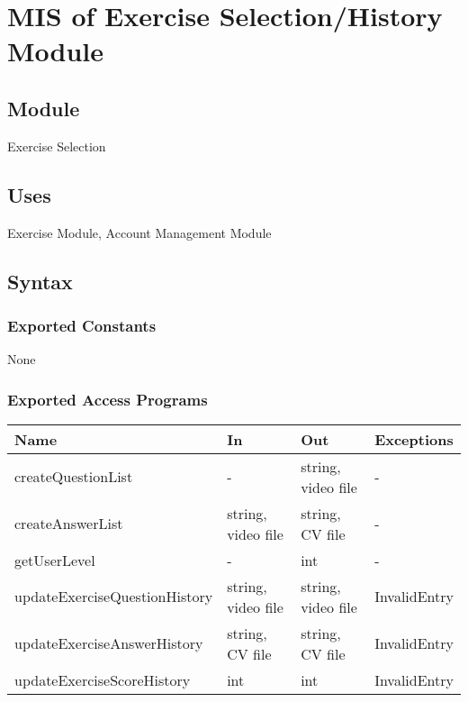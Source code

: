 \documentclass[12pt, titlepage]{article}
\begin{document}
\section{MIS of Exercise Selection/History Module} \label{ExerciseSel} 

\subsection{Module}

Exercise Selection

\subsection{Uses}

Exercise Module, Account Management Module

\subsection{Syntax}

\subsubsection{Exported Constants}

None

\subsubsection{Exported Access Programs}


\begin{center}
\begin{tabular}{p{6cm} p{2cm} p{2cm} p{4cm}}
\hline
\textbf{Name} & \textbf{In} & \textbf{Out} & \textbf{Exceptions} \\
\hline
createQuestionList & - & string, video file & - \\
createAnswerList & string, video file & string, CV file & - \\
getUserLevel & - & int & - \\
updateExerciseQuestionHistory & string, video file & string, video file & InvalidEntry \\  %
updateExerciseAnswerHistory & string, CV file & string, CV file & InvalidEntry \\   %
updateExerciseScoreHistory & int & int & InvalidEntry \\ %
\hline
\end{tabular}
\end{center}
\end{document}
